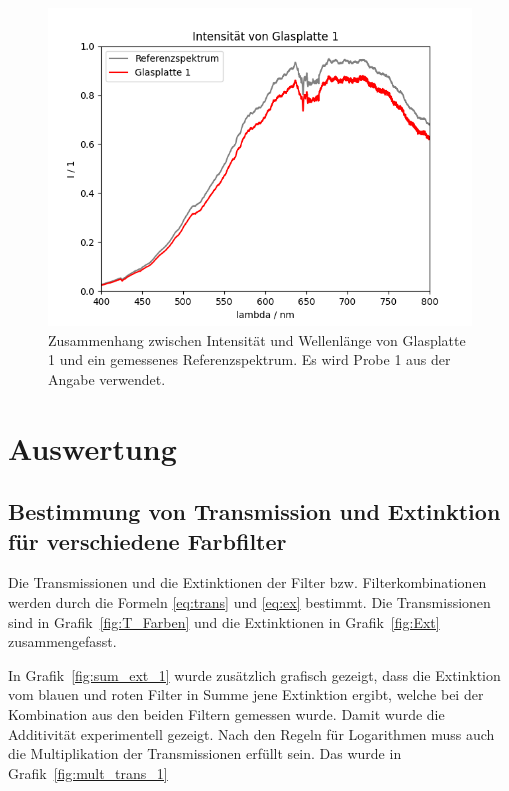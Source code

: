 \documentclass{article}
\begin{document}
\begin{figure}[H]
\centering
\caption{Zusammenhang zwischen Intensität und Wellenlänge von Glasplatte 1 und ein gemessenes Referenzspektrum. Es wird Probe 1 aus der Angabe verwendet.}
\label{fig:I_glas_1}
\includegraphics[scale=0.7]{GP_Intensitaet_1.png}
\end{figure}






\section{Auswertung}

\subsection{Bestimmung von Transmission und Extinktion für verschiedene Farbfilter}

Die Transmissionen und die Extinktionen der Filter bzw. Filterkombinationen werden durch die Formeln \eqref{eq:trans} und \eqref{eq:ex} bestimmt. Die Transmissionen sind in Grafik~\ref{fig:T_Farben} und die Extinktionen in Grafik~\ref{fig:Ext} zusammengefasst.

In Grafik~\ref{fig:sum_ext_1} wurde zusätzlich grafisch gezeigt, dass die Extinktion vom blauen und roten Filter in Summe jene Extinktion ergibt, welche bei der Kombination aus den beiden Filtern gemessen wurde. Damit wurde die Additivität experimentell gezeigt. Nach den Regeln für Logarithmen muss auch die Multiplikation der Transmissionen erfüllt sein. Das wurde in Grafik~\ref{fig:mult_trans_1}
\end{document}
